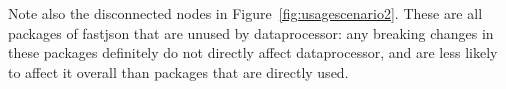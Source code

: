 Note also the disconnected nodes in Figure~\ref{fig:usagescenario2}. These are all packages of fastjson that are unused by dataprocessor: any breaking changes in these packages definitely do not directly affect dataprocessor, and are less likely to affect it overall than packages that are directly used.
